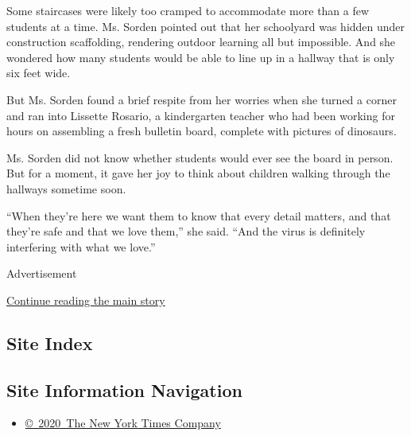 Some staircases were likely too cramped to accommodate more than a few
students at a time. Ms. Sorden pointed out that her schoolyard was
hidden under construction scaffolding, rendering outdoor learning all
but impossible. And she wondered how many students would be able to line
up in a hallway that is only six feet wide.

But Ms. Sorden found a brief respite from her worries when she turned a
corner and ran into Lissette Rosario, a kindergarten teacher who had
been working for hours on assembling a fresh bulletin board, complete
with pictures of dinosaurs.

Ms. Sorden did not know whether students would ever see the board in
person. But for a moment, it gave her joy to think about children
walking through the hallways sometime soon.

``When they're here we want them to know that every detail matters, and
that they're safe and that we love them,'' she said. ``And the virus is
definitely interfering with what we love.''

Advertisement

\protect\hyperlink{after-bottom}{Continue reading the main story}

\hypertarget{site-index}{%
\subsection{Site Index}\label{site-index}}

\hypertarget{site-information-navigation}{%
\subsection{Site Information
Navigation}\label{site-information-navigation}}

\begin{itemize}
\tightlist
\item
  \href{https://help.nytimes3xbfgragh.onion/hc/en-us/articles/115014792127-Copyright-notice}{©~2020~The
  New York Times Company}
\end{itemize}

